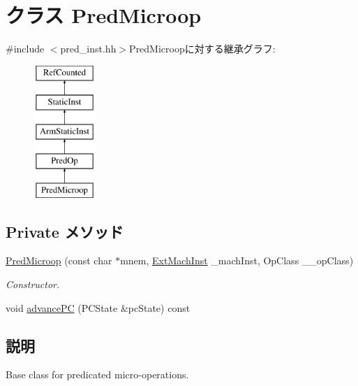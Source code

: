 \hypertarget{classArmISA_1_1PredMicroop}{
\section{クラス PredMicroop}
\label{classArmISA_1_1PredMicroop}
}


{\ttfamily \#include $<$pred\_\-inst.hh$>$}PredMicroopに対する継承グラフ:\begin{figure}[H]
\begin{center}
\leavevmode
\includegraphics[height=5cm]{classArmISA_1_1PredMicroop}
\end{center}
\end{figure}
\subsection*{Private メソッド}
\begin{DoxyCompactItemize}
\item 
\hyperlink{classArmISA_1_1PredMicroop_acf4caa1f1a88e8ec2dde3d9e82a80b44}{PredMicroop} (const char $\ast$mnem, \hyperlink{classStaticInst_a5605d4fc727eae9e595325c90c0ec108}{ExtMachInst} \_\-machInst, OpClass \_\-\_\-opClass)
\begin{DoxyCompactList}\small\item\em Constructor. \item\end{DoxyCompactList}\item 
void \hyperlink{classArmISA_1_1PredMicroop_af04cd01429462d48e635f3e01ced6257}{advancePC} (PCState \&pcState) const 
\end{DoxyCompactItemize}


\subsection{説明}
Base class for predicated micro-\/operations. 

